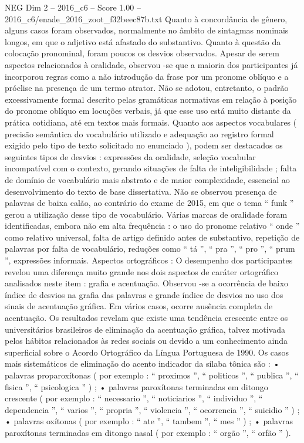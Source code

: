\begin{textsample}{NEG Dim 2 – 2016\_c6 – Score 1.00 – 2016\_c6/enade\_2016\_zoot\_f32beec87b.txt}
Quanto à concordância de gênero, alguns casos foram observados, normalmente no âmbito de sintagmas nominais longos, em que o adjetivo está afastado do substantivo.
Quanto à questão da colocação pronominal, foram poucos os desvios observados.
Apesar de serem aspectos relacionados à oralidade, observou -se que a maioria dos participantes já incorporou regras como a não introdução da frase por um pronome oblíquo e a próclise na presença de um termo atrator.
Não se adotou, entretanto, o padrão excessivamente formal descrito pelas gramáticas normativas em relação à posição do pronome oblíquo em locuções verbais, já que esse uso está muito distante da prática cotidiana, até em textos mais formais.
Quanto aos aspectos vocabulares ( precisão semântica do vocabulário utilizado e adequação ao registro formal exigido pelo tipo de texto solicitado no enunciado ), podem ser destacados os seguintes tipos de desvios : expressões da oralidade, seleção vocabular incompatível com o contexto, gerando situações de falta de inteligibilidade ; falta de domínio de vocabulário mais abstrato e de maior complexidade, essencial ao desenvolvimento do texto de base dissertativa.
Não se observou presença de palavras de baixa calão, ao contrário do exame de 2015, em que o tema “ funk ” gerou a utilização desse tipo de vocabulário.
Várias marcas de oralidade foram identificadas, embora não em alta frequência : o uso do pronome relativo “ onde ” como relativo universal, falta de artigo definido antes de substantivo, repetição de palavras por falta de vocabulário, reduções como “ tá ”, “ pra ”, “ pro ”, “ prum ”, expressões informais.
Aspectos ortográficos : O desempenho dos participantes revelou uma diferença muito grande nos dois aspectos de caráter ortográfico analisados neste item : grafia e acentuação.
Observou -se a ocorrência de baixo índice de desvios na grafia das palavras e grande índice de desvios no uso dos sinais de acentuação gráfica.
Em vários casos, ocorre ausência completa de acentuação.
Os resultados revelam que existe uma tendência crescente entre os universitários brasileiros de eliminação da acentuação gráfica, talvez motivada pelos hábitos relacionados às redes sociais ou devido a um conhecimento ainda superficial sobre o Acordo Ortográfico da Língua Portuguesa de 1990.
Os casos mais sistemáticos de eliminação do acento indicador da sílaba tônica são : • palavras proparoxítonas ( por exemplo : “ proximos ”, “ politicos ”, “ publica ”, “ fisica ”, “ psicologica ” ) ; • palavras paroxítonas terminadas em ditongo crescente ( por exemplo : “ necessario ”, “ noticiarios ”, “ individuo ”, “ dependencia ”, “ varios ”, “ propria ”, “ violencia ”, “ ocorrencia ”, “ suicidio ” ) ; • palavras oxítonas ( por exemplo : “ ate ”, “ tambem ”, “ mes ” ) ; • palavras paroxítonas terminadas em ditongo nasal ( por exemplo : “ orgão ”, “ orfão ” ).

\end{textsample}
